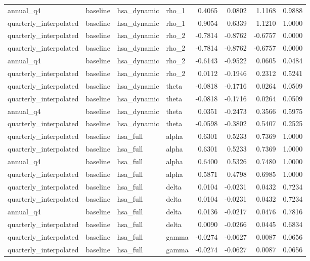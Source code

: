 \begin{tabular}{llllrrrr}
annual\_q4 & baseline & hsa\_dynamic & rho\_1 & 0.4065 & 0.0802 & 1.1168 & 0.9888 \\
quarterly\_interpolated & baseline & hsa\_dynamic & rho\_1 & 0.9054 & 0.6339 & 1.1210 & 1.0000 \\
quarterly\_interpolated & baseline & hsa\_dynamic & rho\_2 & -0.7814 & -0.8762 & -0.6757 & 0.0000 \\
quarterly\_interpolated & baseline & hsa\_dynamic & rho\_2 & -0.7814 & -0.8762 & -0.6757 & 0.0000 \\
annual\_q4 & baseline & hsa\_dynamic & rho\_2 & -0.6143 & -0.9522 & 0.0605 & 0.0484 \\
quarterly\_interpolated & baseline & hsa\_dynamic & rho\_2 & 0.0112 & -0.1946 & 0.2312 & 0.5241 \\
quarterly\_interpolated & baseline & hsa\_dynamic & theta & -0.0818 & -0.1716 & 0.0264 & 0.0509 \\
quarterly\_interpolated & baseline & hsa\_dynamic & theta & -0.0818 & -0.1716 & 0.0264 & 0.0509 \\
annual\_q4 & baseline & hsa\_dynamic & theta & 0.0351 & -0.2473 & 0.3566 & 0.5975 \\
quarterly\_interpolated & baseline & hsa\_dynamic & theta & -0.0598 & -0.3802 & 0.5407 & 0.2525 \\
quarterly\_interpolated & baseline & hsa\_full & alpha & 0.6301 & 0.5233 & 0.7369 & 1.0000 \\
quarterly\_interpolated & baseline & hsa\_full & alpha & 0.6301 & 0.5233 & 0.7369 & 1.0000 \\
annual\_q4 & baseline & hsa\_full & alpha & 0.6400 & 0.5326 & 0.7480 & 1.0000 \\
quarterly\_interpolated & baseline & hsa\_full & alpha & 0.5871 & 0.4798 & 0.6985 & 1.0000 \\
quarterly\_interpolated & baseline & hsa\_full & delta & 0.0104 & -0.0231 & 0.0432 & 0.7234 \\
quarterly\_interpolated & baseline & hsa\_full & delta & 0.0104 & -0.0231 & 0.0432 & 0.7234 \\
annual\_q4 & baseline & hsa\_full & delta & 0.0136 & -0.0217 & 0.0476 & 0.7816 \\
quarterly\_interpolated & baseline & hsa\_full & delta & 0.0090 & -0.0266 & 0.0445 & 0.6834 \\
quarterly\_interpolated & baseline & hsa\_full & gamma & -0.0274 & -0.0627 & 0.0087 & 0.0656 \\
quarterly\_interpolated & baseline & hsa\_full & gamma & -0.0274 & -0.0627 & 0.0087 & 0.0656 \\

\end{tabular}
